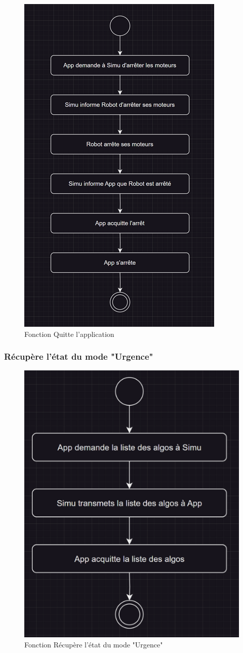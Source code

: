 \begin{figure}[H]
    \centering
    \includegraphics[scale=0.25]{data/function3.png}
    \caption{Fonction Quitte l'application}
    \label{fig:ihm_quit}
\end{figure}

\subsubsection{Récupère l'état du mode "Urgence"}

\begin{figure}[H]
    \centering
    \includegraphics[scale=0.25]{data/function4.png}
    \caption{Fonction Récupère l'état du mode "Urgence"}
    \label{fig:ihm_get_emergency}
\end{figure}
